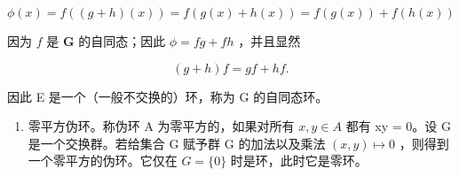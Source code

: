 \[
\phi (x) = f ((g + h) (x)) = f (g (x) + h (x)) = f (g (x)) + f (h (x))
\]

因为 \(f\) 是 \(\mathbf{G}\) 的自同态；因此 \(\phi = fg + fh\) ，并且显然

\[
(g + h) f = g f + h f.
\]

因此 E 是一个（一般不交换的）环，称为 G 的自同态环。

\begin{enumerate}
\def\labelenumi{\Roman{enumi}.}
\setcounter{enumi}{6}
\tightlist
\item
  零平方伪环。称伪环 A 为零平方的，如果对所有 \(x, y \in A\) 都有 xy = 0。设 G 是一个交换群。若给集合 G 赋予群 G 的加法以及乘法 \((x, y) \mapsto 0\) ，则得到一个零平方的伪环。它仅在 \(G = \{0\}\) 时是环，此时它是零环。
\end{enumerate}

